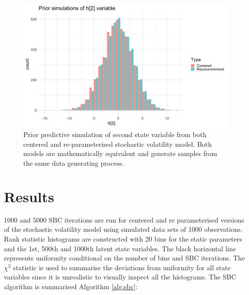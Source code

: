 \documentclass[12pt, a4paper]{article}
\begin{document}
        \begin{figure}[h]
            \centering
            \includegraphics[scale=0.1]{figures/ppc_h2.png}
            \caption{Prior predictive simulation of second state variable from both centered and re-parameterised stochastic volatility model. Both models are mathematically equivalent and generate samples from the same data generating process.}
            \label{fig:priorpred}
        \end{figure}
        



\section{Results}
    1000 and 5000 SBC iterations are run for centered and re parameterised versions of the stochastic volatility model using simulated data sets of 1000 observations. Rank statistic histograms are constructed with 20 bins for the static parameters and the 1st, 500th and 1000th latent state variables. The black horizontal line represents uniformity conditional on the number of bins and SBC iterations. The $\chi^2$ statistic is used to summarise the deviations from uniformity for all state variables since it is unrealistic to visually inspect all the histograms. The SBC algorithm is summarised Algorithm \ref{alg:sbc}:
\end{document}
